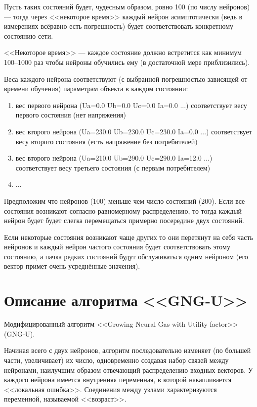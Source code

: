 \documentclass[unicode, 12pt, a4paper,oneside,fleqn]{article}
\begin{document}
Пусть таких состояний будет, чудесным образом, ровно 100 (по числу
нейронов) --- тогда через <<некоторое время>> каждый нейрон
асимптотически (ведь в измерениях всёравно есть погрешность) будет
соответствовать конкретному состоянию сети.

<<Некоторое время>> --- каждое состояние должно встретится как минимум
100--1000 раз чтобы нейроны обучились ему (в достаточной мере
приблизились).

Веса каждого нейрона соответствуют (с выбранной погрешностью зависящей
от времени обучения) параметрам объекта в каждом состоянии:
\begin{enumerate}
\item вес первого нейрона (Ua=0.0 Ub=0.0 Uc=0.0 Ia=0.0 ...)
  соответствует весу первого состояния (нет напряжения)
\item вес второго нейрона (Ua=230.0 Ub=230.0 Uc=230.0 Ia=0.0 ...)
  соответствует весу второго состояния (есть напряжение без
  потребителей)
\item вес второго нейрона (Ua=210.0 Ub=290.0 Uc=290.0 Ia=12.0 ...)
  соответствует весу третьего состояния (с первым потребителем)
\item ...
\end{enumerate}


Предположим что нейронов (100) меньше чем число состояний (200).  Если
все состояния возникают согласно равномерному распределению, то тогда
каждый нейрон будет будет слегка перемещаться примерно посередине двух
состояний.

Если некоторые состояния возникают чаще других то они перетянут на
себя часть нейронов и каждый нейрон частого состояния будет
соответствовать этому состоянию, а пачка редких состояний будут
обслуживаться одним нейроном (его вектор примет очень усреднённые
значения).


\section{Описание алгоритма <<GNG-U>>}
Модифицированный алгоритм <<Growing Neural Gas with Utility factor>>
(GNG-U).

Начиная всего с двух нейронов, алгоритм последовательно изменяет (по
большей части, увеличивает) их число, одновременно создавая набор
связей между нейронами, наилучшим образом отвечающий распределению
входных векторов. У каждого нейрона имеется внутренняя переменная, в
которой накапливается <<локальная ошибка>>. Соединения между узлами
характеризуются переменной, называемой <<возраст>>.
\end{document}
